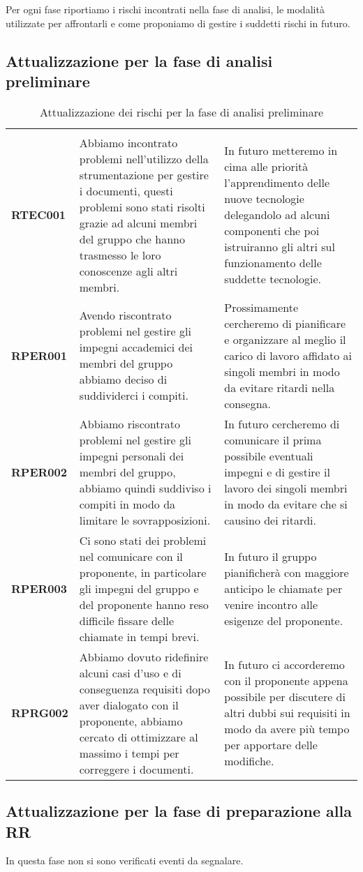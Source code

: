 \documentclass[../piano-di-progetto]{subfiles}
\begin{document}
Per ogni fase riportiamo i rischi incontrati nella fase di analisi, le modalità utilizzate per affrontarli e come proponiamo di gestire i suddetti rischi in futuro.

\subsection{Attualizzazione per la fase di analisi preliminare}%
\label{sub:attualizzazione_fase_analisi_preliminare}

\begin{longtable}[H]{|p{10em}|p{17em}|p{17em}|}
  \caption{Attualizzazione dei rischi per la fase di analisi preliminare}%
  \label{tab:attualizzazione_fase_analisi_preliminare} \\
  \rowcolor{darkgray!90!}
  \color{white}{\textbf{Rischio}} & \color{white}{\textbf{Gestione}} & \color{white}{\textbf{Monitoraggio}} \\
  \textbf{RTEC001} & Abbiamo incontrato problemi nell'utilizzo della strumentazione per gestire i documenti, questi problemi sono stati risolti grazie ad alcuni membri del gruppo che hanno trasmesso le loro conoscenze agli altri membri. & In futuro metteremo in cima alle priorità l'apprendimento delle nuove tecnologie delegandolo ad alcuni componenti che poi istruiranno gli altri sul funzionamento delle suddette tecnologie.\\
  \textbf{RPER001} & Avendo riscontrato problemi nel gestire gli impegni accademici dei membri del gruppo abbiamo deciso di suddividerci i compiti. & Prossimamente cercheremo di pianificare e organizzare al meglio il carico di lavoro affidato ai singoli membri in modo da evitare ritardi nella consegna.\\
  \textbf{RPER002} & Abbiamo riscontrato problemi nel gestire gli impegni personali dei membri del gruppo, abbiamo quindi suddiviso i compiti in modo da limitare le sovrapposizioni. & In futuro cercheremo di comunicare il prima possibile eventuali impegni e di gestire il lavoro dei singoli membri in modo da evitare che si causino dei ritardi.\\
  \textbf{RPER003} & Ci sono stati dei problemi nel comunicare con il proponente, in particolare gli impegni del gruppo e del proponente hanno reso difficile fissare delle chiamate in tempi brevi. & In futuro il gruppo pianificherà con maggiore anticipo le chiamate per venire incontro alle esigenze del proponente.\\
  \textbf{RPRG002} & Abbiamo dovuto ridefinire alcuni casi d'uso e di conseguenza requisiti dopo aver dialogato con il proponente, abbiamo cercato di ottimizzare al massimo i tempi per correggere i documenti. & In futuro ci accorderemo con il proponente appena possibile per discutere di altri dubbi sui requisiti in modo da avere più tempo per apportare delle modifiche.\\
\end{longtable}


\subsection{Attualizzazione per la fase di preparazione alla RR}%
\label{sub:attualizzazione_fase_prep_RR}
In questa fase non si sono verificati eventi da segnalare.
\end{document}
